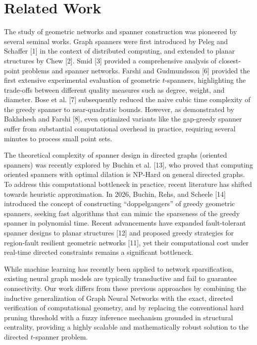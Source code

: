\documentclass[journal]{IEEEtran}
\begin{document}
\section{Related Work}
The study of geometric networks and spanner construction was pioneered by several seminal works. Graph spanners were first introduced by Peleg and Schaffer [1] in the context of distributed computing, and extended to planar structures by Chew [2]. Smid [3] provided a comprehensive analysis of closest-point problems and spanner networks. Farshi and Gudmundsson [6] provided the first extensive experimental evaluation of geometric $t$-spanners, highlighting the trade-offs between different quality measures such as degree, weight, and diameter. Bose et al. [7] subsequently reduced the naive cubic time complexity of the greedy spanner to near-quadratic bounds. However, as demonstrated by Bakhshesh and Farshi [8], even optimized variants like the gap-greedy spanner suffer from substantial computational overhead in practice, requiring several minutes to process small point sets.

The theoretical complexity of spanner design in directed graphs (oriented spanners) was recently explored by Buchin et al. [13], who proved that computing oriented spanners with optimal dilation is NP-Hard on general directed graphs. To address this computational bottleneck in practice, recent literature has shifted towards heuristic approximation. In 2026, Buchin, Rehs, and Scheele [14] introduced the concept of constructing ``doppelgangers'' of greedy geometric spanners, seeking fast algorithms that can mimic the sparseness of the greedy spanner in polynomial time. Recent advancements have expanded fault-tolerant spanner designs to planar structures [12] and proposed greedy strategies for region-fault resilient geometric networks [11], yet their computational cost under real-time directed constraints remains a significant bottleneck.

While machine learning has recently been applied to network sparsification, existing neural graph models are typically transductive and fail to guarantee connectivity. Our work differs from these previous approaches by combining the inductive generalization of Graph Neural Networks with the exact, directed verification of computational geometry, and by replacing the conventional hard pruning threshold with a fuzzy inference mechanism grounded in structural centrality, providing a highly scalable and mathematically robust solution to the directed $t$-spanner problem.
\end{document}
